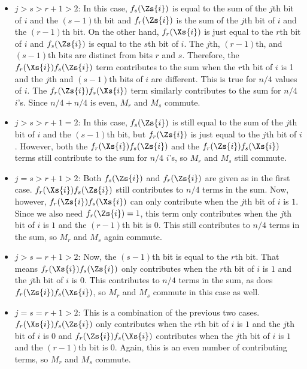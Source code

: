 \begin{itemize}
	\item $j > s > r+1 > 2$: In this case, $f_s (\Zs{i})$ is equal to the sum of
	the $j$th bit of $i$ and the $(s-1)$th bit and $f_r (\Zs{i})$ is the sum of the
	$j$th bit of $i$ and the $(r-1)$th bit.  On the other hand, $f_r(\Xs{i})$ is
	just equal to the $r$th bit of $i$ and $f_s(\Zs{i})$ is equal to the $s$th
	bit of $i$.  The $j$th, $(r-1)$th, and $(s-1)$th bits are distinct from bits
	$r$ and $s$.  Therefore, the $f_r (\Xs{i}) f_s (\Zs{i})$ term contributes to
	the sum when the $r$th bit of $i$ is 1 and the $j$th and $(s-1)$th bits of
	$i$ are different.  This is true for $n/4$ values of $i$.  The $f_r(\Zs{i})
	f_s (\Xs{i})$ term similarly contributes to the sum for $n/4$ $i$'s.  Since
	$n/4 + n/4$ is even, $M_r$ and $M_s$ commute.

	\item $j > s > r+1 = 2$: In this case, $f_s (\Zs{i})$ is still equal to the sum
	of the $j$th bit of $i$ and the $(s-1)$th bit, but $f_r (\Zs{i})$ is just equal
	to the $j$th bit of $i$.  However, both the $f_r (\Xs{i}) f_s (\Zs{i})$ and the
	$f_r (\Zs{i}) f_s (\Xs{i})$ terms still contribute to the sum for $n/4$ $i$'s,
	so $M_r$ and $M_s$ still commute.

	\item $j = s > r+1 > 2$: Both $f_s (\Zs{i})$ and $f_r (\Zs{i})$ are given as in
	the first case.  $f_r (\Xs{i}) f_s (\Zs{i})$ still contributes to $n/4$ terms
	in the sum.  Now, however, $f_r (\Zs{i}) f_s (\Xs{i})$ can only contribute when
	the $j$th bit of $i$ is $1$.  Since we also need $f_r (\Zs{i}) = 1$, this term
	only contributes when the $j$th bit of $i$ is $1$ and the $(r-1)$th bit is $0$.
	This still contributes to $n/4$ terms in the sum, so $M_r$ and $M_s$ again
	commute.

	\item $j > s = r+1 > 2$: Now, the $(s-1)$th bit is equal to the $r$th bit. That
	means $f_r (\Xs{i}) f_s (\Zs{i})$ only contributes when the $r$th bit of $i$ is
	$1$ and the $j$th bit of $i$ is $0$.  This contributes to $n/4$ terms in the
	sum, as does $f_r (\Zs{i}) f_s (\Xs{i})$, so $M_r$ and $M_s$ commute in this
	case as well.

	\item $j = s = r+1 > 2$: This is a combination of the previous two cases.
	$f_r (\Xs{i}) f_s (\Zs{i})$ only contributes when the $r$th bit of $i$ is $1$
	and the $j$th bit of $i$ is $0$ and $f_r (\Zs{i}) f_s (\Xs{i})$ contributes
	when the $j$th bit of $i$ is $1$ and the $(r-1)$th bit is $0$.  Again, this is
	an even number of contributing terms, so $M_r$ and $M_s$ commute.


\end{itemize}
